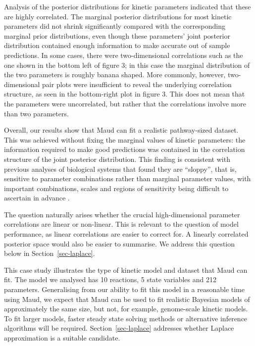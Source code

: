 \documentclass[journal=asbcd6,manuscript=article,layout=traditional]{achemso}
\begin{document}
Analysis of the posterior distributions for kinetic parameters indicated
that these are highly correlated. The marginal posterior distributions
for most kinetic parameters did not shrink significantly compared with
the corresponding marginal prior distributions, even though these
parameters' joint posterior distribution contained enough information to
make accurate out of sample predictions. In some cases, there were
two-dimensional correlations such as the one shown in the bottom left of
figure 3; in this case the marginal distribution of the two parameters
is roughly banana shaped. More commonly, however, two-dimensional pair
plots were insufficient to reveal the underlying correlation structure,
as seen in the bottom-right plot in figure 3. This does not mean that
the parameters were uncorrelated, but rather that the correlations
involve more than two parameters.

Overall, our results show that Maud can fit a realistic pathway-sized
dataset. This was achieved without fixing the marginal values of kinetic
parameters: the information required to make good predictions was
contained in the correlation structure of the joint posterior
distribution. This finding is consistent with previous analyses of
biological systems that found they are ``sloppy'', that is, sensitive to
parameter combinations rather than marginal parameter values, with
important combinations, scales and regions of sensitivity being
difficult to ascertain in advance
\citep{gutenkunst_2007, poirier_revising_1998}.

The question naturally arises whether the crucial high-dimensional
parameter correlations are linear or non-linear. This is relevant to the
question of model performance, as linear correlations are easier to
correct for. A linearly correlated posterior space would also be easier
to summarise. We address this question below in
Section~\ref{sec-laplace}.

This case study illustrates the type of kinetic model and dataset that
Maud can fit. The model we analysed has 10 reactions, 5 state variables
and 212 parameters. Generalising from our ability to fit this model in a
reasonable time using Maud, we expect that Maud can be used to fit
realistic Bayesian models of approximately the same size, but not, for
example, genome-scale kinetic models. To fit larger models, faster
steady state solving methods or alternative inference algorithms will be
required. Section~\ref{sec-laplace} addresses whether Laplace
approximation is a suitable candidate.
\end{document}
